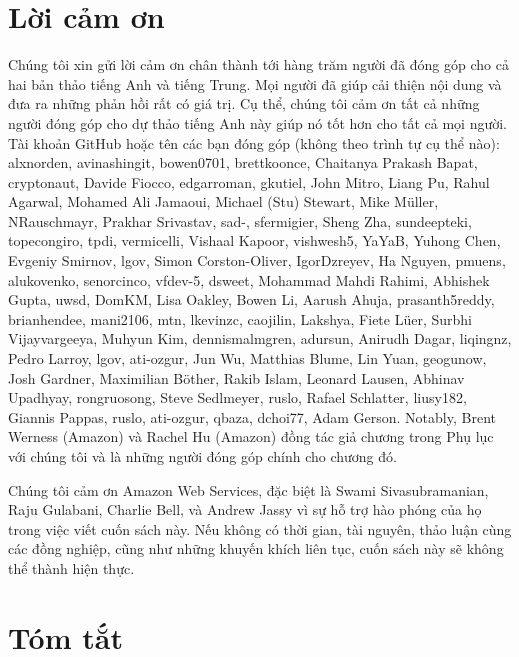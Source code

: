 \documentclass[letterpaper,11pt,english]{sphinxmanual}
\begin{document}
\section{Lời cảm ơn}
\label{\detokenize{chapter_preface/index_vn:loi-cam-on}}


Chúng tôi xin gửi lời cảm ơn chân thành tới hàng trăm người đã đóng góp
cho cả hai bản thảo tiếng Anh và tiếng Trung. Mọi người đã giúp cải
thiện nội dung và đưa ra những phản hồi rất có giá trị. Cụ thể, chúng
tôi cảm ơn tất cả những người đóng góp cho dự thảo tiếng Anh này giúp nó
tốt hơn cho tất cả mọi người. Tài khoản GitHub hoặc tên các bạn đóng góp
(không theo trình tự cụ thể nào): alxnorden, avinashingit, bowen0701,
brettkoonce, Chaitanya Prakash Bapat, cryptonaut, Davide Fiocco,
edgarroman, gkutiel, John Mitro, Liang Pu, Rahul Agarwal, Mohamed Ali
Jamaoui, Michael (Stu) Stewart, Mike Müller, NRauschmayr, Prakhar
Srivastav, sad-, sfermigier, Sheng Zha, sundeepteki, topecongiro, tpdi,
vermicelli, Vishaal Kapoor, vishwesh5, YaYaB, Yuhong Chen, Evgeniy
Smirnov, lgov, Simon Corston-Oliver, IgorDzreyev, Ha Nguyen, pmuens,
alukovenko, senorcinco, vfdev-5, dsweet, Mohammad Mahdi Rahimi, Abhishek
Gupta, uwsd, DomKM, Lisa Oakley, Bowen Li, Aarush Ahuja, prasanth5reddy,
brianhendee, mani2106, mtn, lkevinzc, caojilin, Lakshya, Fiete Lüer,
Surbhi Vijayvargeeya, Muhyun Kim, dennismalmgren, adursun, Anirudh
Dagar, liqingnz, Pedro Larroy, lgov, ati-ozgur, Jun Wu, Matthias Blume,
Lin Yuan, geogunow, Josh Gardner, Maximilian Böther, Rakib Islam,
Leonard Lausen, Abhinav Upadhyay, rongruosong, Steve Sedlmeyer, ruslo,
Rafael Schlatter, liusy182, Giannis Pappas, ruslo, ati-ozgur, qbaza,
dchoi77, Adam Gerson. Notably, Brent Werness (Amazon) và Rachel Hu
(Amazon) đồng tác giả chương  trong Phụ lục với
chúng tôi và là những người đóng góp chính cho chương đó.



Chúng tôi cảm ơn Amazon Web Services, đặc biệt là Swami Sivasubramanian,
Raju Gulabani, Charlie Bell, và Andrew Jassy vì sự hỗ trợ hào phóng của
họ trong việc viết cuốn sách này. Nếu không có thời gian, tài nguyên,
thảo luận cùng các đồng nghiệp, cũng như những khuyến khích liên tục,
cuốn sách này sẽ không thể thành hiện thực.




\section{Tóm tắt}
\label{\detokenize{chapter_preface/index_vn:tom-tat}}
\end{document}
